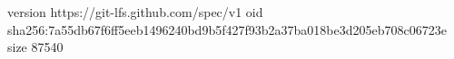 version https://git-lfs.github.com/spec/v1
oid sha256:7a55db67f6ff5eeb1496240bd9b5f427f93b2a37ba018be3d205eb708c06723e
size 87540
